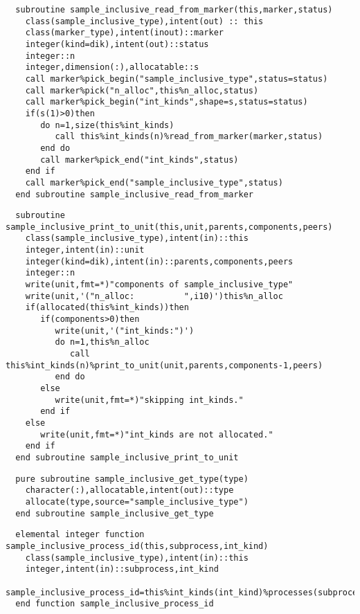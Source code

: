 \begin{Verbatim}
  subroutine sample_inclusive_read_from_marker(this,marker,status)
    class(sample_inclusive_type),intent(out) :: this
    class(marker_type),intent(inout)::marker
    integer(kind=dik),intent(out)::status
    integer::n
    integer,dimension(:),allocatable::s
    call marker%pick_begin("sample_inclusive_type",status=status)
    call marker%pick("n_alloc",this%n_alloc,status)
    call marker%pick_begin("int_kinds",shape=s,status=status)
    if(s(1)>0)then
       do n=1,size(this%int_kinds)
          call this%int_kinds(n)%read_from_marker(marker,status)
       end do
       call marker%pick_end("int_kinds",status)
    end if
    call marker%pick_end("sample_inclusive_type",status)
  end subroutine sample_inclusive_read_from_marker
\end{Verbatim}

\begin{Verbatim}
  subroutine sample_inclusive_print_to_unit(this,unit,parents,components,peers)
    class(sample_inclusive_type),intent(in)::this
    integer,intent(in)::unit
    integer(kind=dik),intent(in)::parents,components,peers
    integer::n
    write(unit,fmt=*)"components of sample_inclusive_type"
    write(unit,'("n_alloc:          ",i10)')this%n_alloc
    if(allocated(this%int_kinds))then
       if(components>0)then
          write(unit,'("int_kinds:")')
          do n=1,this%n_alloc
             call this%int_kinds(n)%print_to_unit(unit,parents,components-1,peers)
          end do
       else
          write(unit,fmt=*)"skipping int_kinds."
       end if
    else
       write(unit,fmt=*)"int_kinds are not allocated."
    end if
  end subroutine sample_inclusive_print_to_unit
\end{Verbatim}
 
\begin{Verbatim}
  pure subroutine sample_inclusive_get_type(type)
    character(:),allocatable,intent(out)::type
    allocate(type,source="sample_inclusive_type")
  end subroutine sample_inclusive_get_type
\end{Verbatim}

\begin{Verbatim}
  elemental integer function sample_inclusive_process_id(this,subprocess,int_kind)
    class(sample_inclusive_type),intent(in)::this
    integer,intent(in)::subprocess,int_kind
    sample_inclusive_process_id=this%int_kinds(int_kind)%processes(subprocess)
  end function sample_inclusive_process_id
\end{Verbatim}

